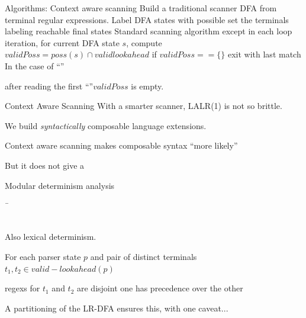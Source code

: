 \documentclass[notes,11pt,aspectratio=169]{beamer}
\newcommand{\eblue}[1]{{\usebeamercolor[fg]{bluecolor}#1}}
\begin{document}
\begin{frame}{Algorithms: Context aware scanning}
\biA
 \x Build a traditional scanner DFA from terminal regular expressions.
 \x Label DFA states with \eblue{possible set}
  \bi
    \x the terminals labeling reachable final states
  \ei
 \x Standard scanning algorithm except 
   \bi \x in each loop iteration, for current DFA state $s$,
       \x compute $validPoss  = poss(s) \cap validlookahead$
       \x if $validPoss == \{ \}$ exit with last match
   \ei
 \x In the case of ``'' 

    after reading the first ``\code{>}''$validPoss$ is empty.
\ei
\end{frame}



\begin{frame}{Context Aware Scanning}
\biA
\x With a smarter scanner, LALR(1) is not so brittle.

\x We  build \emph{syntactically} composable language
extensions.

\x Context aware scanning makes composable syntax ``more likely''

\pause
\x But it does not give a 
\ei
\end{frame}


\begin{frame}{Modular determinism analysis}

\bis{0.3cm}
 \x 
{\large
\begin{tabbing}
  \ \= 
      \\
 \>    \\

\end{tabbing}
}

 \x Also lexical determinism.

    For each parser state $p$ and pair of distinct terminals $t_1, t_2
    \in \mathit{valid-lookahead}(p)$

   \bi
    \x regexs for $t_1$ and $t_2$ are disjoint
    \x one has precedence over the other
   \ei

 \x A partitioning of the LR-DFA ensures this, with one caveat...

\ei
{}
\end{frame}
\end{document}
